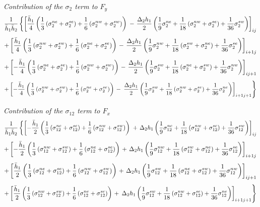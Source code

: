 {\it Contribution of the $\sigma_2$ term to $F_y$}
$$
{1\over \bar{h}_1\bar{h}_2}\left\{ 
\left[{\bar{h}_1\over 4}
 \left( {1\over 3}\left(\sigma_2^{ne}+\sigma_2^{se}\right) 
       +{1\over
6}\left(\sigma_2^{nw}+\sigma_2^{sw}\right)\right)\right.\right.
-\left.{\Delta_2h_1\over 2}
      \left({1\over 9}\sigma_2^{ne}
           +{1\over 18}\left(\sigma_2^{nw}+\sigma_2^{se}\right)
           +{1\over 36}\sigma_2^{sw}\right)\right]_{ij} $$
$$
+\left[{\bar{h}_1\over 4}
 \left( {1\over 3}\left(\sigma_2^{nw}+\sigma_2^{sw}\right) 
       +{1\over
6}\left(\sigma_2^{ne}+\sigma_2^{se}\right)\right)\right.
-\left.{\Delta_2h_1\over 2}
      \left({1\over 9}\sigma_2^{nw}
           +{1\over 18}\left(\sigma_2^{sw}+\sigma_2^{ne}\right)
           +{1\over 36}\sigma_2^{se}\right)\right]_{i+1j} $$
$$
+\left[-{\bar{h}_1\over 4}
 \left({1\over 3}\left(\sigma_2^{ne}+\sigma_2^{se}\right) 
      +{1\over
6}\left(\sigma_2^{nw}+\sigma_2^{sw}\right)\right)\right.
-\left.{\Delta_2h_1\over 2}
      \left({1\over 9}\sigma_2^{sw}
           +{1\over 18}\left(\sigma_2^{ne}+\sigma_2^{sw}\right)
           +{1\over 36}\sigma_2^{nw}\right)\right]_{ij+1} $$
$$
+\left[-{\bar{h}_1\over 4}
 \left({1\over 3}\left(\sigma_2^{nw}+\sigma_2^{sw}\right) 
      +{1\over
6}\left(\sigma_2^{ne}+\sigma_2^{se}\right)\right)\right.
-\left.\left.{\Delta_2h_1\over 2}
      \left({1\over 9}\sigma_2^{sw}
           +{1\over 18}\left(\sigma_2^{nw}+\sigma_2^{se}\right)
           +{1\over 36}\sigma_2^{ne}\right)\right]_{i+1j+1} \right\} $$

{\it Contribution of the $\sigma_{12}$ term to $F_x$}
$$
{1\over \bar{h}_1\bar{h}_2}\left\{ 
\left[-{\bar{h}_1\over 2}
  \left({1\over 3}\left(\sigma_{12}^{ne}+\sigma_{12}^{se}\right) 
 +{1\over
6}\left(\sigma_{12}^{nw}+\sigma_{12}^{sw}\right)\right)\right.\right.
+\left.{\Delta_2h_1}
      \left({1\over 9}\sigma_{12}^{ne}
           +{1\over 18}\left(\sigma_{12}^{nw}+\sigma_{12}^{se}\right)
           +{1\over 36}\sigma_{12}^{sw}\right)\right]_{ij} $$
$$
+\left[-{\bar{h}_1\over 2}
 \left({1\over 3}\left(\sigma_{12}^{nw}+\sigma_{12}^{sw}\right) 
      +{1\over
6}\left(\sigma_{12}^{ne}+\sigma_{12}^{se}\right)\right)\right.
+\left.{\Delta_2h_1}
      \left({1\over 9}\sigma_{12}^{nw}
           +{1\over 18}\left(\sigma_{12}^{sw}+\sigma_{12}^{ne}\right)
           +{1\over 36}\sigma_{12}^{se}\right)\right]_{i+1j} $$
$$
+\left[{\bar{h}_1\over 2}
 \left({1\over 3}\left(\sigma_{12}^{ne}+\sigma_{12}^{se}\right) 
      +{1\over
6}\left(\sigma_{12}^{nw}+\sigma_{12}^{sw}\right)\right)\right.
+\left.{\Delta_2h_1}
      \left({1\over 9}\sigma_{12}^{sw}
           +{1\over 18}\left(\sigma_{12}^{ne}+\sigma_{12}^{sw}\right)
           +{1\over 36}\sigma_{12}^{nw}\right)\right]_{ij+1} $$
$$
+\left[{\bar{h}_1\over 2}
 \left({1\over 3}\left(\sigma_{12}^{nw}+\sigma_{12}^{sw}\right) 
      +{1\over
6}\left(\sigma_{12}^{ne}+\sigma_{12}^{se}\right)\right)\right.
+\left.\left.{\Delta_2h_1}
      \left({1\over 9}\sigma_{12}^{sw}
           +{1\over 18}\left(\sigma_{12}^{nw}+\sigma_{12}^{se}\right)
           +{1\over 36}\sigma_{12}^{ne}\right)\right]_{i+1j+1}
\right\} $$

